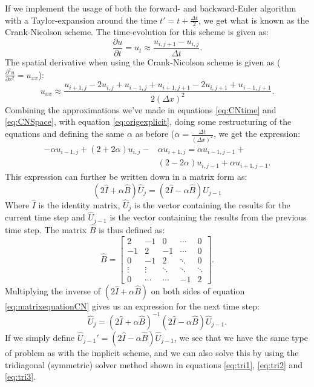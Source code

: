 \documentclass[reprint,english,notitlepage]{revtex4-1}  %
\begin{document}
If we implement the usage of both the forward- and backward-Euler algorithm with a Taylor-expansion around the time $t' = t + \frac{\Delta t}{2}$, we get what is known as the Crank-Nicolson scheme. The time-evolution for this scheme is given as:
\begin{equation}\label{eq:CNtime}
    \frac{\partial u}{\partial t} = u_t \approx \frac{u_{i,j+1} - u_{i,j}}{\Delta t}.
\end{equation}
The spatial derivative when using the Crank-Nicolson scheme is given as ($\frac{\partial^2 u}{\partial x^2} = u_{xx}$):
\begin{equation}\label{eq:CNSpace}
    u_{xx} \approx \frac{u_{i+1,j} - 2u_{i,j} + u_{i-1,j} + u_{i+1,j+1} - 2u_{i,j+1} + u_{i-1,j+1}}{2(\Delta x)^2}.
\end{equation}
Combining the approximations we've made in equations \ref{eq:CNtime} and \ref{eq:CNSpace}, with equation \ref{eq:origexplicit}, doing some restructuring of the equations and defining the same $\alpha$ as before ($\alpha = \frac{\Delta t}{(\Delta x)^2}$, we get the expression:
\begin{equation}
    \begin{split}
    -\alpha u_{i-1,j}+(2+2\alpha)u_{i,j}-&\alpha u_{i+1,j} = \alpha u_{i-1,j-1} + \\&(2-2\alpha)u_{i,j-1} + \alpha u_{i+1,j-1}.
    \end{split}
\end{equation}
This expression can further be written down in a matrix form as:
\begin{equation}\label{eq:matrixequationCN}
    (2\hat{I} + \alpha \hat{B})\hat{U}_j = (2\hat{I} - \alpha\hat{B})\hat{U}_{j-1}
\end{equation}
Where $\hat{I}$ is the identity matrix, $\hat{U}_j$ is the vector containing the results for the current time step and $\hat{U}_{j-1}$ is the vector containing the results from the previous time step. The matrix $\hat{B}$ is thus defined as:
\begin{equation}
    \hat{B} = \begin{bmatrix} 2&-1&0&\cdots&0\\-1&2&-1&\cdots&0\\0&-1&2&\ddots&0\\\vdots&\vdots&\ddots&\ddots&\ddots\\0&\cdots&\cdots&-1&2\end{bmatrix}.
\end{equation}
Multiplying the inverse of $(2\hat{I} + \alpha\hat{B})$ on both sides of equation \ref{eq:matrixequationCN} gives us an expression for the next time step:
\begin{equation}
    \hat{U}_{j} = (2\hat{I}+\alpha\hat{B})^{-1}(2\hat{I}-\alpha\hat{B})\hat{U}_{j-1}.
\end{equation}
If we simply define $\hat{U}_{j-1}' = (2\hat{I}-\alpha\hat{B})\hat{U}_{j-1}$, we see that we have the same type of problem as with the implicit scheme, and we can also solve this by using the tridiagonal (symmetric) solver method shown in equations \ref{eq:tri1}, \ref{eq:tri2} and \ref{eq:tri3}.
\end{document}
